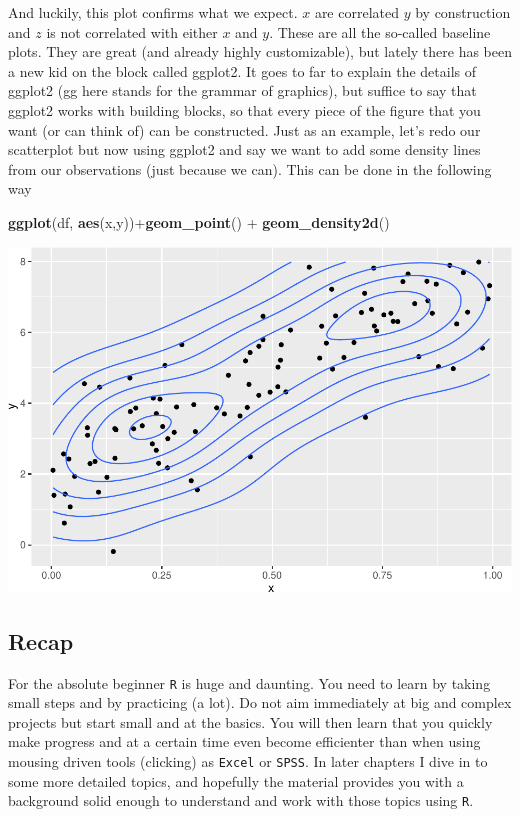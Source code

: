 \documentclass[]{article}
\newenvironment{Shaded}{\begin{snugshade}}{\end{snugshade}}
\newcommand{\KeywordTok}[1]{\textcolor[rgb]{0.13,0.29,0.53}{\textbf{{#1}}}}
\newcommand{\StringTok}[1]{\textcolor[rgb]{0.31,0.60,0.02}{{#1}}}
\newcommand{\NormalTok}[1]{{#1}}
\begin{document}
And luckily, this plot confirms what we expect. \(x\) are correlated
\(y\) by construction and \(z\) is not correlated with either \(x\) and
\(y\). These are all the so-called baseline plots. They are great (and
already highly customizable), but lately there has been a new kid on the
block called ggplot2. It goes to far to explain the details of ggplot2
(gg here stands for the grammar of graphics), but suffice to say that
ggplot2 works with building blocks, so that every piece of the figure
that you want (or can think of) can be constructed. Just as an example,
let's redo our scatterplot but now using ggplot2 and say we want to add
some density lines from our observations (just because we can). This can
be done in the following way

\begin{Shaded}
\begin{Highlighting}[]
\KeywordTok{ggplot}\NormalTok{(df, }\KeywordTok{aes}\NormalTok{(x,y))+}\KeywordTok{geom_point}\NormalTok{() +}\StringTok{ }\KeywordTok{geom_density2d}\NormalTok{()}
\end{Highlighting}
\end{Shaded}

\includegraphics{./unnamed-chunk-27-1.pdf}

\subsection{Recap}\label{recap}

For the absolute beginner \texttt{R} is huge and daunting. You need to
learn by taking small steps and by practicing (a lot). Do not aim
immediately at big and complex projects but start small and at the
basics. You will then learn that you quickly make progress and at a
certain time even become efficienter than when using mousing driven
tools (clicking) as \texttt{Excel} or \texttt{SPSS}. In later chapters I
dive in to some more detailed topics, and hopefully the material
provides you with a background solid enough to understand and work with
those topics using \texttt{R}.
\end{document}
